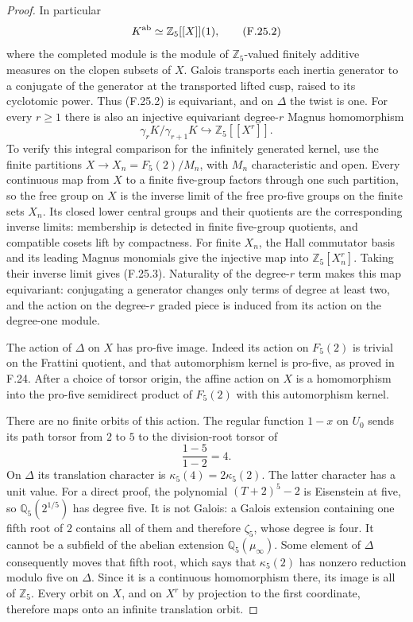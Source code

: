 \begin{proof}
In particular
\[
 K^{\rm ab}\simeq\mathbb Z_5[[X]](1),                       \tag{F.25.2}
\]
where the completed module is the module of
$\mathbb Z_5$-valued finitely additive measures on
the clopen subsets of $X$.
Galois transports each inertia generator to a
conjugate of the generator at the transported
lifted cusp, raised to its cyclotomic power.
Thus (F.25.2) is equivariant, and on $\Delta$ the
twist is one.
For every $r\ge1$ there is also an injective
equivariant degree-$r$ Magnus homomorphism
\[
 \gamma_rK/\gamma_{r+1}K
          \hookrightarrow\mathbb Z_5[[X^r]].               \tag{F.25.3}
\]
To verify this integral comparison for the
infinitely generated kernel, use the finite
partitions $X\to X_n=F_5(2)/M_n$, with $M_n$
characteristic and open.  Every continuous map
from $X$ to a finite five-group factors through
one such partition, so the free group on $X$ is
the inverse limit of the free pro-five groups
on the finite sets $X_n$.
Its closed lower central groups and their
quotients are the corresponding inverse limits:
membership is detected in finite five-group
quotients, and compatible cosets lift by compactness.
For finite $X_n$, the Hall commutator basis
and its leading Magnus monomials give the
injective map into $\mathbb Z_5[X_n^r]$.
Taking their inverse limit gives (F.25.3).
Naturality of the degree-$r$ term makes this
map equivariant: conjugating a generator changes
only terms of degree at least two, and the action
on the degree-$r$ graded piece is induced from
its action on the degree-one module.

The action of $\Delta$ on $X$ has pro-five image.
Indeed its action on $F_5(2)$ is trivial on the
Frattini quotient, and that automorphism kernel
is pro-five, as proved in F.24.  After a choice
of torsor origin, the affine action on $X$ is
a homomorphism into the pro-five semidirect
product of $F_5(2)$ with this automorphism kernel.

There are no finite orbits of this action.
The regular function $1-x$ on $U_0$ sends its
path torsor from $2$ to $5$ to the division-root
torsor of
\[
                       \frac{1-5}{1-2}=4.
\]
On $\Delta$ its translation character is
$\kappa_5(4)=2\kappa_5(2)$.
The latter character has a unit value.
For a direct proof, the polynomial
$(T+2)^5-2$ is Eisenstein at five, so
$\mathbb Q_5(2^{1/5})$ has degree five.
It is not Galois: a Galois extension containing
one fifth root of $2$ contains all of them
and therefore $\zeta_5$, whose degree is four.
It cannot be a subfield of the abelian extension
$\mathbb Q_5(\mu_\infty)$.
Some element of $\Delta$ consequently moves that
fifth root, which says that $\kappa_5(2)$ has
nonzero reduction modulo five on $\Delta$.
Since it is a continuous homomorphism there,
its image is all of $\mathbb Z_5$.
Every orbit on $X$, and on $X^r$ by projection
to the first coordinate, therefore maps onto
an infinite translation orbit.


\end{proof}
